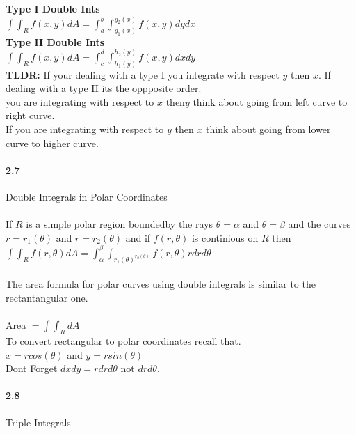 \documentclass[14pt]{extreport}
\begin{document}
\textbf{Type I Double Ints}\\
$\int \int_R f(x,y)dA = \int_a^b\int_{g_1(x)}^{g_2(x)}f(x,y)dydx$\\

\textbf{Type II Double Ints}\\
$\int\int_R f(x,y)dA = \int_c^d\int_{h_1(y)}^{h_2(y)}f(x,y)dxdy$\\

\textbf{TLDR: } If your dealing with a type I you integrate with respect $y$ then $x$. If dealing with a type II its the oppposite order.\\

 you are integrating with respect to $x$ then$ y$ think about going from left curve to right curve.\\
 If you are integrating with respect to $y$ then $x$ think about going from lower curve to higher curve.\\


\paragraph{2.7} Double Integrals in Polar Coordinates\\\\

If $R$ is a simple polar region boundedby the rays $\theta = \alpha$ and $\theta = \beta$ and the curves
$r = r_1(\theta)$ and $r = r_2(\theta)$ and if $f(r, \theta)$ is continious on $R$ then $\int\int_R f(r, \theta)dA = \int_{\alpha}^{\beta} \int_{r_1(\theta)^{r_2(\theta)} } f(r, \theta)rdrd\theta$\\\\

The area formula for polar curves using double integrals is similar to the rectantangular one.\\\\

Area $= \int\int_R dA$\\


To convert rectangular to polar coordinates recall that.\\

$x = rcos(\theta)$ and $y = rsin(\theta)$\\

Dont Forget $dxdy = rdrd\theta$ not $drd\theta$.\\


\paragraph{2.8} Triple Integrals\\\\
\end{document}
